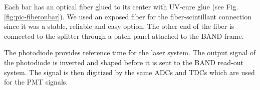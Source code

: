 \documentclass[3p,final,twocolumn]{elsarticle}
\begin{document}
Each bar has an optical fiber glued to its center with UV-cure glue (see
Fig. \ref{fig:pic-fiberonbar}). We used an exposed fiber for the fiber-scintillant connection since it was a stable, reliable and easy option. The other end of the fiber is connected to the splitter through a patch panel attached to the BAND frame. 

The photodiode provides reference time for the laser system. The output
signal of the photodiode is inverted and shaped before it is sent to
the BAND read-out system. The signal is then digitized by the same ADCs and
TDCs which are used for the PMT signals.





\end{document}
